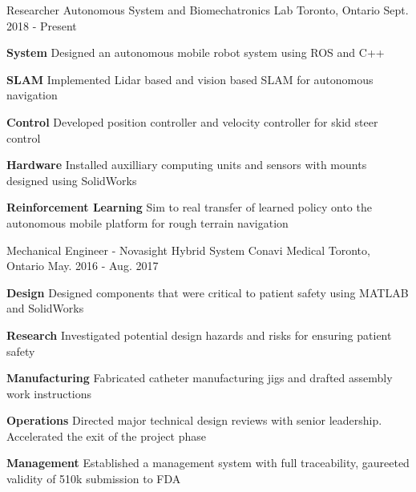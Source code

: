 \begin{cventries}
	\cventry
	{Researcher}
	{Autonomous System and Biomechatronics Lab}
	{Toronto, Ontario}
	{Sept. 2018 - Present}
	{
		\begin{cvitems}
			\item {
				\textbf{System} Designed an autonomous mobile robot system using ROS and C++
			}
			\item {
				\textbf{SLAM} Implemented Lidar based and vision based SLAM for autonomous navigation
			}
			\item {
				\textbf{Control} Developed position controller and velocity controller for skid steer control
			}
			\item {
				\textbf{Hardware} Installed auxilliary computing units and sensors with mounts designed using SolidWorks
			}
			\item {
				\textbf{Reinforcement Learning} Sim to real transfer of learned policy onto the autonomous mobile platform for rough terrain navigation
			}
		\end{cvitems}
	}
	\cventry
	{Mechanical Engineer - Novasight Hybrid System}
	{Conavi Medical} 
	{Toronto, Ontario}
	{May. 2016 - Aug. 2017}
	{
		\begin{cvitems}
			\item {
				\textbf{Design} Designed components that were critical to patient safety using MATLAB and SolidWorks
			}
			\item {
				\textbf{Research} Investigated potential design hazards and risks for ensuring patient safety
			}
			\item {
				\textbf{Manufacturing} Fabricated catheter manufacturing jigs and drafted assembly work instructions
			}
			\item {
				\textbf{Operations} Directed major technical design reviews with senior leadership. Accelerated the exit of the project phase
			}
			\item {
				\textbf{Management} Established a management system with full traceability, gaureeted validity of 510k submission to FDA
			}
		\end{cvitems}
	}  
\end{cventries}

